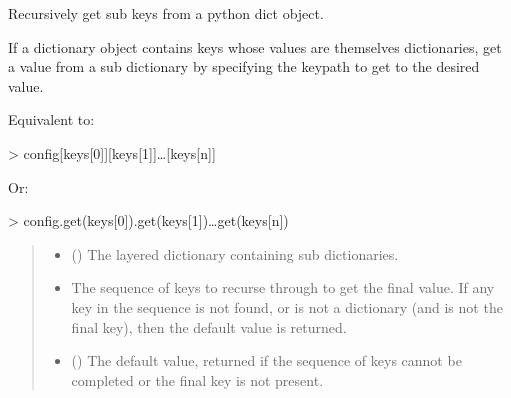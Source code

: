 \documentclass[letterpaper,10pt,english]{sphinxmanual}
\begin{document}
\begin{fulllineitems}
\label{\detokenize{misc:glomar_gridding.io.get_recurse}}
\pysigstartsignatures
\pysiglinewithargsret
{}
{\sphinxparamcomma {}\sphinxparamcomma {}}
{}
\pysigstopsignatures
\sphinxAtStartPar
Recursively get sub keys from a python dict object.

\sphinxAtStartPar
If a dictionary object contains keys whose values are themselves
dictionaries, get a value from a sub dictionary by specifying the key\sphinxhyphen{}path
to get to the desired value.

\sphinxAtStartPar
Equivalent to:

\sphinxAtStartPar
\textgreater{} config{[}keys{[}0{]}{]}{[}keys{[}1{]}{]}…{[}keys{[}n{]}{]}

\sphinxAtStartPar
Or:

\sphinxAtStartPar
\textgreater{} config.get(keys{[}0{]}).get(keys{[}1{]})…get(keys{[}n{]})
\begin{quote}\begin{description}
\begin{itemize}
\item {}
\sphinxAtStartPar
{} () \textendash{} The layered dictionary containing sub dictionaries.

\item {}
\sphinxAtStartPar
{} \textendash{} The sequence of keys to recurse through to get the final value. If any
key in the sequence is not found, or is not a dictionary (and is not
the final key), then the default value is returned.

\item {}
\sphinxAtStartPar
{} () \textendash{} The default value, returned if the sequence of keys cannot be completed
or the final key is not present.

\end{itemize}

\sphinxAtStartPar
{}


\end{description}
\end{quote}
\end{fulllineitems}
\end{document}
